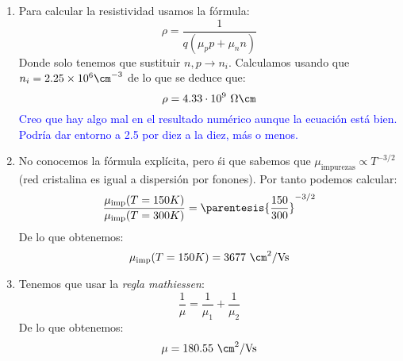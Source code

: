 	\begin{enumerate}[label=\alph*)]
		\item Para calcular la resistividad usamos la fórmula:
		\begin{equation}
			\rho = \frac{1}{q(\mu_p p + \mu_n n )}
		\end{equation}
		Donde solo tenemos que sustituir $n,p\rightarrow n_i$. Calculamos usando que $n_i= 2.25\times 10^6 \cm^{-3}$ de lo que se deduce que:
		\begin{equation}
		\rho =4.33\cdot 10^9 \ \Omega \cm
		\end{equation}
		\textcolor{Blue}{Creo que hay algo mal en el resultado numérico aunque la ecuación está bien. Podría dar entorno a 2.5 por diez a la diez, más o menos.}
		\item No conocemos la fórmula explícita, pero śi que sabemos que $\mu_{\text{impurezas}}\propto T^{-3/2}$ (red cristalina es igual a dispersión por fonones). Por tanto podemos calcular:
		\begin{equation}
			\frac{\mu_{\text{imp}} (T=150K)}{\mu_{\text{imp}}(T=300K)} = \parentesis{\frac{150}{300}}^{-3/2}		
		\end{equation}
		De lo que obtenemos:
		\begin{equation}
			\mu_{\text{imp}} (T=150K) = 3677 \ \cm^2 / \text{Vs}
		\end{equation}
		\item Tenemos que usar la \textit{regla mathiessen}:
		\begin{equation}
			\frac{1}{\mu} = \frac{1}{\mu_{1}}+\frac{1}{\mu_{2}}
		\end{equation}
		De lo que obtenemos:		
		\begin{equation}
			\mu = 180.55 \ \cm^2 / \text{Vs}
		\end{equation}
	\end{enumerate}
